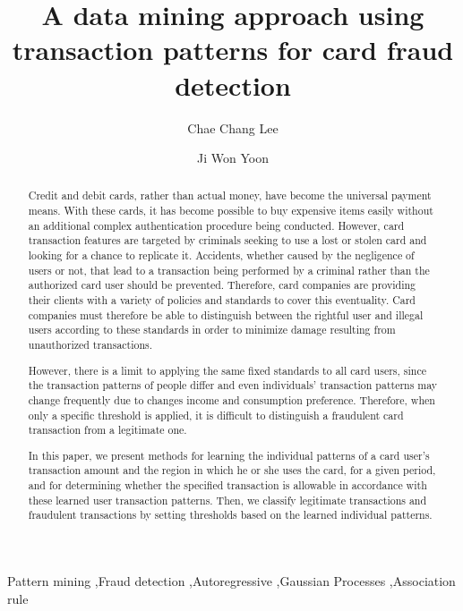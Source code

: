\documentclass[final,authoryear,5p,times,twocolumn]{elsarticle}
\begin{document}
\begin{frontmatter}


\title{A data mining approach using transaction patterns for card fraud detection}

\author{Chae Chang Lee}

\author{Ji Won Yoon}

\address{Graduate School of Information Security, Korea University, Seoul, Republic of Korea}



\begin{abstract}

Credit and debit cards, rather than actual money, have become the universal payment means. With these cards, it has become possible to buy expensive items easily without an additional complex authentication procedure being conducted. However, card transaction features are targeted by criminals seeking to use a lost or stolen card and looking for a chance to replicate it. Accidents, whether caused by the negligence of users or not, that lead to a transaction being performed by a criminal rather than the authorized card user should be prevented. Therefore, card companies are providing their clients with a variety of policies and standards to cover this eventuality. Card companies must therefore be able to distinguish between the rightful user and illegal users according to these standards in order to minimize damage resulting from unauthorized transactions.

However, there is a limit to applying the same fixed standards to all card users, since the transaction patterns of people differ and even individuals' transaction patterns may change frequently due to changes income and consumption preference. Therefore, when only a specific threshold is applied, it is difficult to distinguish a fraudulent card transaction from a legitimate one.

In this paper, we present methods for learning the individual patterns of a card user's transaction amount and the region in which he or she uses the card, for a given period, and for determining whether the specified transaction is allowable in accordance with these learned user transaction patterns. Then, we classify legitimate transactions and fraudulent transactions by setting thresholds based on the learned individual patterns.

\end{abstract}


\begin{keyword}

Pattern mining \sep Fraud detection \sep Autoregressive \sep Gaussian Processes \sep Association rule
\end{keyword}

\end{frontmatter}
\end{document}
